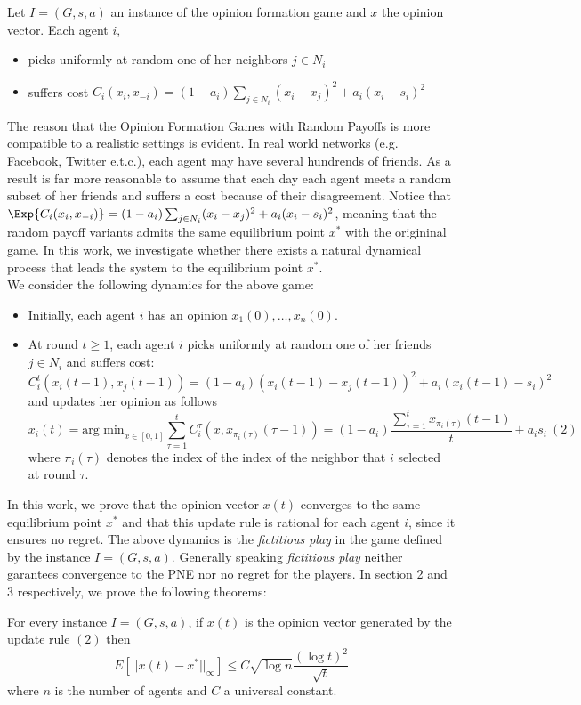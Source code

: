 \begin{definition}
 Let $I=(G,s,a)$ an instance of the opinion formation game and $x$ the opinion vector. Each agent $i$, 
 \begin{itemize}
  \item picks uniformly at random one of her neighbors $j \in N_i$
  \item suffers cost $C_i(x_i,x_{-i}) = (1-a_i)\sum_{j \in N_i}(x_i-x_j)^2 + a_i(x_i-s_i)^2$
 \end{itemize}

\end{definition} The reason that the Opinion Formation Games with Random Payoffs is more compatible to a realistic settings is evident. In real world networks (e.g. Facebook, Twitter e.t.c.),
each agent may have several hundrends of friends. As a result is far more reasonable to assume that each day each agent meets a random subset of her friends and suffers a cost because of their disagreement. Notice that $\Exp{C_i(x_i,x_{-i})} = (1-a_i)\sum_{j \in N_i}(x_i-x_j)^2 + a_i(x_i-s_i)^2$, meaning that the random payoff variants admits the same equilibrium point $x^*$ with the origininal game. In this work, we investigate whether there exists a natural dynamical process that leads the system to the equilibrium point $x^*$.\\

\noindent We consider the following dynamics for the above game:
 \begin{itemize}
 \item Initially, each agent $i$ has an opinion $x_1(0),\ldots,x_n(0)$.
 \item At round $t \geq 1$, each agent $i$ picks uniformly at random one of her friends $j \in N_i$ and suffers cost: $$C^t_i(x_i(t-1),x_{j}(t-1))=(1-a_i)(x_i(t-1) -x_j(t-1))^2 + a_i(x_i(t-1)-s_i)^2$$ and updates her opinion as follows 
 $$x_i(t) = \text{arg min}_{x \in [0,1]} \sum_{\tau=1}^tC^{\tau}_i(x,x_{\pi_i(\tau)}(\tau-1))=(1-a_i)\frac{\sum_{\tau=1}^t x_{\pi_i(\tau)}(t-1)}{t} + a_is_i~(2) \label{eq:fictitious_play} $$ where $\pi_i(\tau)$ denotes the index of the index of the neighbor that $i$ selected at round $\tau$.
 \end{itemize}

 
 \noindent In this work, we prove that the opinion vector $x(t)$ converges to the same equilibrium point $x^*$ and that this update rule is rational for each agent $i$, since it ensures no regret. The above dynamics is the \emph{fictitious play} in the game defined by the instance $I=(G,s,a)$. Generally speaking \emph{fictitious play} neither garantees convergence to the PNE nor no regret for the players. In section 2 and 3 respectively, we prove the following theorems:
\begin{theorem}
For every instance $I=(G,s,a)$, if $x(t)$ is the opinion vector generated by the update rule $(2)$ then $$E[||x(t)-x^*||_{\infty}]\leq C \sqrt{\log n}\frac{(\log t)^2}{\sqrt{t}}$$ where $n$ is the number of agents and $C$ a universal constant.
\end{theorem}



